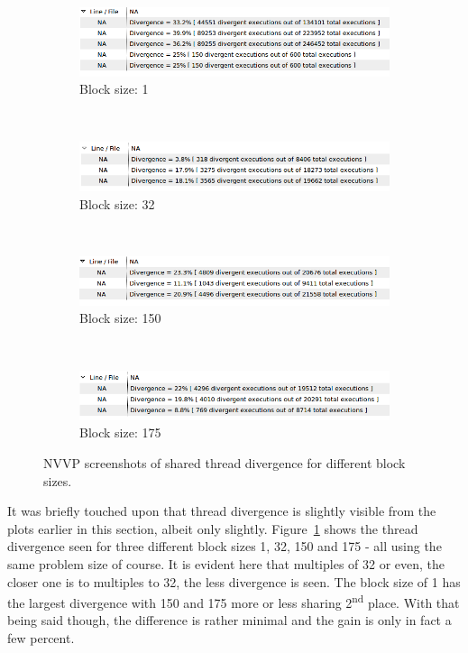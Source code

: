 \begin{figure}
	\centering
	\begin{subfigure}{0.7\linewidth}
		\centering
		\includegraphics[width = \linewidth]{Figures/sparse_divergence_1}
		\caption{Block size: 1}
	\end{subfigure}\\
	\begin{subfigure}{0.7\linewidth}
		\centering
		\includegraphics[width=\linewidth]{Figures/sparse_divergence_32}
		\caption{Block size: 32}
	\end{subfigure}\\
	\begin{subfigure}{0.7\linewidth}
		\centering
		\includegraphics[width=\linewidth]{Figures/sparse_divergence_150}
		\caption{Block size: 150}
	\end{subfigure}\\
	\begin{subfigure}{0.7\linewidth}
		\centering
		\includegraphics[width=\linewidth]{Figures/sparse_divergence_175}
		\caption{Block size: 175}
	\end{subfigure}
	\caption{NVVP screenshots of shared thread divergence for different block sizes.}
	\label{fig:sparse_diverge_prof}
\end{figure}

It was briefly touched upon that thread divergence is slightly visible from the plots earlier in this section, albeit only slightly. Figure~\ref{fig:sparse_diverge_prof} shows the thread divergence seen for three different block sizes 1, 32, 150 and 175 - all using the same problem size of course. It is evident here that multiples of 32 or even, the closer one is to multiples to 32, the less divergence is seen. The block size of 1 has the largest divergence with 150 and 175 more or less sharing 2\textsuperscript{nd} place. With that being said though, the difference is rather minimal and the gain is only in fact a few percent.

